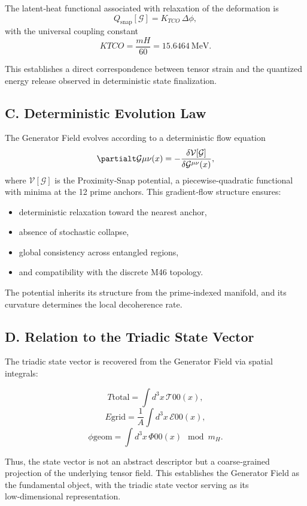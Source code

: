 \documentclass[reprint,amsmath,amssymb,aps,prl,floatfix]{revtex4-2}
\begin{document}
The latent‑heat functional associated with relaxation of the deformation is  
\[
Q_{\mathrm{snap}}[\mathcal{G}]
=
K_{TCO}\,\Delta\phi,
\]  
with the universal coupling constant  
\[
K{TCO} = \frac{mH}{60} = 15.6464\ \mathrm{MeV}.
\]
\medskip

This establishes a direct correspondence between tensor strain and the quantized energy release observed in deterministic state finalization.

\subsection{C. Deterministic Evolution Law}

The Generator Field evolves according to a deterministic flow equation  
\[
\partialt \mathcal{G}{\mu\nu}(x)
=
-\frac{\delta \mathcal{V}[\mathcal{G}]}{\delta \mathcal{G}^{\mu\nu}(x)},
\]  
where \(\mathcal{V}[\mathcal{G}]\) is the Proximity‑Snap potential, a piecewise‑quadratic functional with minima at the 12 prime anchors. This gradient‑flow structure ensures:
\begin{itemize}
\item deterministic relaxation toward the nearest anchor,
\item absence of stochastic collapse,
\item global consistency across entangled regions,
\item and compatibility with the discrete M46 topology.
\end{itemize}
\medskip

The potential inherits its structure from the prime‑indexed manifold, and its curvature determines the local decoherence rate.

\subsection{D. Relation to the Triadic State Vector}

The triadic state vector is recovered from the Generator Field via spatial integrals:
\medskip

\[
T{\mathrm{total}} = \int d^3x\, \mathcal{T}{00}(x),
\]
\[
E{\mathrm{grid}} = \frac{1}{A}\int d^3x\, \mathcal{E}{00}(x),
\]
\[
\phi{\mathrm{geom}} = \int d^3x\, \Phi{00}(x) \mod m_H.
\]
\medskip

Thus, the state vector is not an abstract descriptor but a coarse‑grained projection of the underlying tensor field. This establishes the Generator Field as the fundamental object, with the triadic state vector serving as its low‑dimensional representation.
\end{document}
